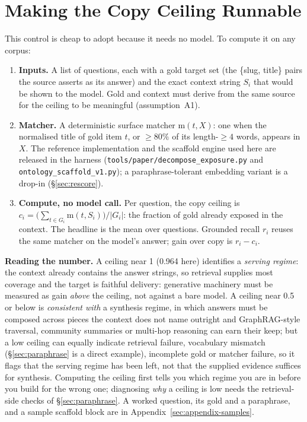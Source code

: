 \documentclass[10pt,twocolumn]{article}
\begin{document}
\section{Making the Copy Ceiling Runnable}\label{sec:runnable}
This control is cheap to adopt because it needs no model. To compute it on any corpus:
\begin{enumerate}[topsep=2pt,itemsep=1pt,leftmargin=1.6em]
\item \textbf{Inputs.} A list of questions, each with a gold target set (the \{slug, title\} pairs the source asserts as its answer) and the exact context string $S_i$ that would be shown to the model. Gold and context must derive from the same source for the ceiling to be meaningful (assumption~A1).
\item \textbf{Matcher.} A deterministic surface matcher $\mathrm{m}(t,X)$: one when the normalised title of gold item $t$, or $\geq80\%$ of its length-$\geq4$ words, appears in $X$. The reference implementation and the scaffold engine used here are released in the harness (\texttt{tools/paper/decompose\_exposure.py} and \texttt{ontology\_scaffold\_v1.py}); a paraphrase-tolerant embedding variant is a drop-in (\S\ref{sec:rescore}).
\item \textbf{Compute, no model call.} Per question, the copy ceiling is $c_i=\bigl(\sum_{t\in G_i}\mathrm{m}(t,S_i)\bigr)/|G_i|$: the fraction of gold already exposed in the context. The headline is the mean over questions. Grounded recall $r_i$ reuses the same matcher on the model's answer; gain over copy is $r_i-c_i$.
\end{enumerate}
\textbf{Reading the number.} A ceiling near 1 (0.964 here) identifies a \emph{serving regime}: the context already contains the answer strings, so retrieval supplies most coverage and the target is faithful delivery: generative machinery must be measured as gain \emph{above} the ceiling, not against a bare model. A ceiling near 0.5 or below is \emph{consistent with} a synthesis regime, in which answers must be composed across pieces the context does not name outright and GraphRAG-style traversal, community summaries or multi-hop reasoning can earn their keep; but a low ceiling can equally indicate retrieval failure, vocabulary mismatch (\S\ref{sec:paraphrase} is a direct example), incomplete gold or matcher failure, so it flags that the serving regime has been left, not that the supplied evidence suffices for synthesis. Computing the ceiling first tells you which regime you are in before you build for the wrong one; diagnosing \emph{why} a ceiling is low needs the retrieval-side checks of \S\ref{sec:paraphrase}. A worked question, its gold and a paraphrase, and a sample scaffold block are in Appendix~\ref{sec:appendix-samples}.
\end{document}

